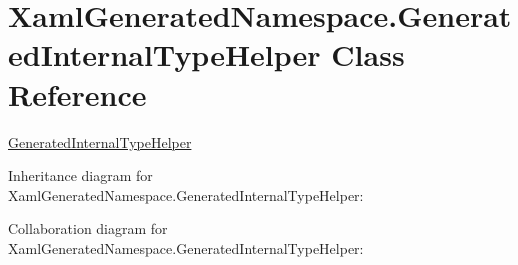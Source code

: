 \hypertarget{class_xaml_generated_namespace_1_1_generated_internal_type_helper}{\section{Xaml\+Generated\+Namespace.\+Generated\+Internal\+Type\+Helper Class Reference}
\label{class_xaml_generated_namespace_1_1_generated_internal_type_helper}
}


\hyperlink{class_xaml_generated_namespace_1_1_generated_internal_type_helper}{Generated\+Internal\+Type\+Helper}  




Inheritance diagram for Xaml\+Generated\+Namespace.\+Generated\+Internal\+Type\+Helper\+:


Collaboration diagram for Xaml\+Generated\+Namespace.\+Generated\+Internal\+Type\+Helper\+:
